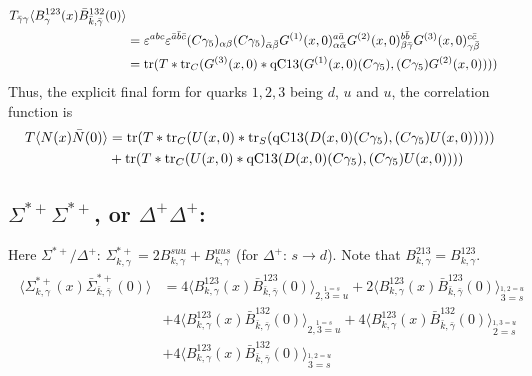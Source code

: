 \documentclass[12pt]{article}
\begin{document}
\begin{gather*}
\begin{split}
T_{\bar{\gamma}\gamma} \langle B^{123}_\gamma(x) \bar{B}^{132}_{\bar{k},\bar{\gamma}}(0)\rangle\\
 &= \varepsilon^{abc}\varepsilon^{\bar{a}\bar{b}\bar{c}} 
    (C\gamma_5)_{\alpha\beta} (C\gamma_5)_{\bar{\alpha}\bar{\beta}}
    G^{(1)}(x,0)^{a\bar{a}}_{\alpha\bar{\alpha}}
    G^{(2)}(x,0)^{b\bar{b}}_{\beta\bar{\gamma}}
    G^{(3)}(x,0)^{c\bar{c}}_{\gamma\bar{\beta}}\\
 &= {\rm tr}(T * {\rm tr}_C(G^{(3)}(x,0)
 * {\rm qC13}(G^{(1)}(x,0)(C\gamma_5),(C\gamma_5)G^{(2)}(x,0))))
\end{split}
\end{gather*}
%
Thus, the explicit final form for quarks $1,2,3$ being $d$, $u$ and $u$,
the correlation function is
%
\begin{gather*}
\begin{split}
T  \langle N(x) \bar{N}(0)\rangle
 &= {\rm tr}(T * {\rm tr}_C(U(x,0)
  * {\rm tr}_S({\rm qC13}(D(x,0)(C\gamma_5),(C\gamma_5)U(x,0)))))\\
 &+ {\rm tr}(T * {\rm tr}_C(U(x,0)
 * {\rm qC13}(D(x,0)(C\gamma_5),(C\gamma_5)U(x,0))))
\end{split}
\end{gather*}


\subsection{$\Sigma^{\ast +}\Sigma^{\ast +}$, or $\Delta^+\Delta^+$:}
Here $\Sigma^{\ast+}/\Delta^+$: 
$\Sigma^{\ast+}_{k,\gamma} = 2 B^{suu}_{k,\gamma} + B^{uus}_{k,\gamma}$ 
(for $\Delta^+$: $s\rightarrow d$). Note that $B^{213}_{k,\gamma}=B^{123}_{k,\gamma}$.
%
\begin{gather*}
\begin{split}
\langle \Sigma^{\ast+}_{k,\gamma}(x) \bar{\Sigma}^{\ast+}_{\bar{k},\bar{\gamma}}(0)\rangle
 &= 4\langle B^{123}_{k,\gamma}(x) \bar{B}^{123}_{\bar{k},\bar{\gamma}}(0)\rangle_{\stackrel{1=s}{2,3=u}}
  + 2\langle B^{123}_{k,\gamma}(x) \bar{B}^{123}_{\bar{k},\bar{\gamma}}(0)\rangle_{\stackrel{1,2=u}{3=s}}\\
 &+ 4\langle B^{123}_{k,\gamma}(x) \bar{B}^{132}_{\bar{k},\bar{\gamma}}(0)\rangle_{\stackrel{1=s}{2,3=u}}
  + 4\langle B^{123}_{k,\gamma}(x) \bar{B}^{132}_{\bar{k},\bar{\gamma}}(0)\rangle_{\stackrel{1,3=u}{2=s}}\\
 &+ 4\langle B^{123}_{k,\gamma}(x) \bar{B}^{132}_{\bar{k},\bar{\gamma}}(0)\rangle_{\stackrel{1,2=u}{3=s}}
\end{split}
\end{gather*}
\end{document}

